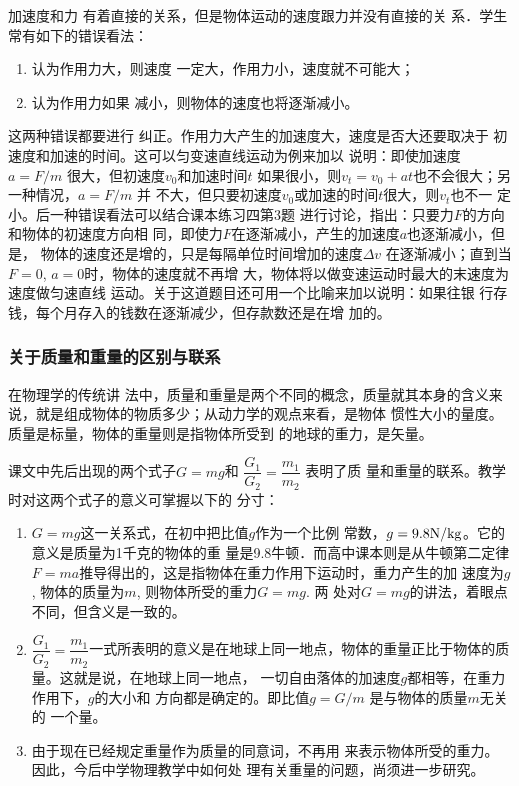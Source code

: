 加速度和力
有着直接的关系，但是物体运动的速度跟力并没有直接的关
系．学生常有如下的错误看法：
\begin{enumerate}
    \item 认为作用力大，则速度
一定大，作用力小，速度就不可能大；
\item 认为作用力如果
减小，则物体的速度也将逐渐减小。
\end{enumerate}
这两种错误都要进行
纠正。作用力大产生的加速度大，速度是否大还要取决于
初速度和加速的时间。这可以匀变速直线运动为例来加以
说明：即使加速度$a=F/m$
很大，但初速度$v_0$和加速时间$t$
如果很小，则$v_t=v_0+at$也不会很大；另一种情况，$a=F/m$
并
不大，但只要初速度$v_0$或加速的时间$t$很大，则$v_t$也不一
定小。后一种错误看法可以结合课本练习四第3题
进行讨论，指出：只要力$F$的方向和物体的初速度方向相
同，即使力$F$在逐渐减小，产生的加速度$a$也逐渐减小，但是，
物体的速度还是增的，只是每隔单位时间增加的速度$\Delta v$
在逐渐减小；直到当$F=0$, $a=0$时，物体的速度就不再增
大，物体将以做变速运动时最大的末速度为速度做匀速直线
运动。关于这道题目还可用一个比喻来加以说明：如果往银
行存钱，每个月存入的钱数在逐渐减少，但存款数还是在增
加的。

\subsubsection{关于质量和重量的区别与联系}

在物理学的传统讲
法中，质量和重量是两个不同的概念，质量就其本身的含义来
说，就是组成物体的物质多少；从动力学的观点来看，是物体
惯性大小的量度。质量是标量，物体的重量则是指物体所受到
的地球的重力，是矢量。

课文中先后出现的两个式子$G=mg$和
$\dfrac{G_1}{G_2}=\dfrac{m_1}{m_2}$
表明了质
量和重量的联系。教学时对这两个式子的意义可掌握以下的
分寸：
\begin{enumerate}
    \item $G=mg$这一关系式，在初中把比值$g$作为一个比例
常数，$g=9.8{\rm N/kg}$。它的意义是质量为1千克的物体的重
量是9.8牛顿．而高中课本则是从牛顿第二定律$F=ma$推导得出的，这是指物体在重力作用下运动时，重力产生的加
速度为$g$, 物体的质量为$m$, 则物体所受的重力$G=mg$. 两
处对$G=mg$的讲法，着眼点不同，但含义是一致的。

\item $\dfrac{G_1}{G_2}=\dfrac{m_1}{m_2}$一式所表明的意义是在地球上同一地点，物体的重量正比于物体的质量。这就是说，在地球上同一地点，
一切自由落体的加速度$g$都相等，在重力作用下，$g$的大小和
方向都是确定的。即比值$g=G/m$
是与物体的质量$m$无关的
一个量。

\item 由于现在已经规定重量作为质量的同意词，不再用
来表示物体所受的重力。因此，今后中学物理教学中如何处
理有关重量的问题，尚须进一步研究。
\end{enumerate}

